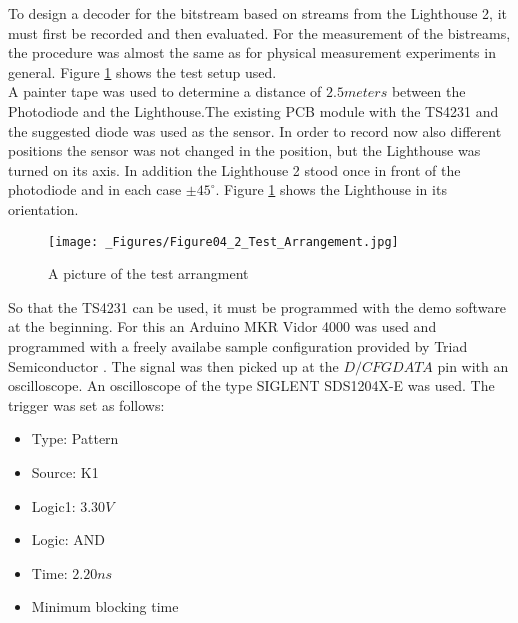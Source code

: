 \documentclass[a4paper,twoside, openright,12pt]{report}
\begin{document}
To design a decoder for the bitstream based on streams from the Lighthouse 2, it must first be recorded and then evaluated. For the measurement of the bistreams, the procedure was almost the same as for physical measurement experiments in general. Figure \ref{Test_Arrangement} shows the test setup used. \\
A painter tape was used to determine a distance of $2.5 meters$ between the Photodiode and the Lighthouse.The existing PCB module with the TS4231 and the suggested diode \cite{TriadSemiconductor.2016} was used as the sensor. In order to record now also different positions the sensor was not changed in the position, but the Lighthouse was turned on its axis. In addition the Lighthouse 2 stood once in front of the photodiode and in each case $\pm 45^\circ$. Figure \ref{Test_Arrangement} shows the Lighthouse in its orientation.
\begin{figure}
\begin{center}
\texttt{[image: \_Figures/Figure04\_2\_Test\_Arrangement.jpg]}
\caption{A picture of the test arrangment}
\label{Test_Arrangement}
\end{center}
\end{figure}
So that the TS4231 can be used, it must be programmed with the demo software at the beginning. For this an Arduino MKR Vidor 4000 was used and programmed with a freely availabe sample configuration provided by Triad Semiconductor \cite{Seibel.}. The signal was then picked up at the $D/CFGDATA$ pin with an oscilloscope. An oscilloscope of the type SIGLENT SDS1204X-E was used. The trigger was set as follows:
\begin{itemize}
\item Type: Pattern
\item Source: K1
\item Logic1: $3.30V$
\item Logic: AND
\item Time: $2.20ns$
\item Minimum blocking time
\end{itemize}
\end{document}
